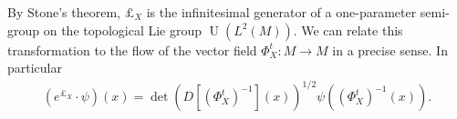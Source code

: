 \documentclass[final,leqno]{siamart}
\newcommand{\pder}[2]{\ensuremath{\frac{ \partial #1}{\partial #2}}}
\newtheorem{example}[theorem]{Example}
\begin{document}
By Stone's theorem, $\pounds_X$ is the infinitesimal generator of a one-parameter semi-group on the topological Lie group $\operatorname{U}(L^2(M))$.
We can relate this transformation to the flow of the vector field $\Phi_X^t:M \to M$ in a precise sense.
In particular
\begin{align*}
	( e^{\pounds_X} \cdot \psi )(x) =  \det( D [(\Phi_X^t)^{-1}](x) )^{1/2} \psi( ( \Phi_X^t)^{-1} (x) ).
\end{align*}



%
\end{document}

